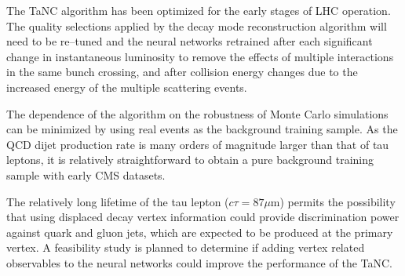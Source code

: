 The TaNC algorithm has been optimized for the early stages of LHC operation.
The quality selections applied by the decay mode reconstruction algorithm will
need to be re--tuned and the neural networks retrained after each significant
change in instantaneous luminosity to remove the effects of multiple
interactions in the same bunch crossing, and after collision energy changes due
to the increased energy of the multiple scattering events.  

The dependence of the algorithm on the robustness of Monte
Carlo simulations can be minimized by using real events as the background
training sample.  As the QCD dijet production rate is many orders of magnitude
larger than that of tau leptons, it is relatively straightforward to obtain a
pure background training sample with early CMS datasets.

The relatively long lifetime of the tau lepton ($c\tau = 87\mu$m) permits the
possibility that using displaced decay vertex information could provide
discrimination power against quark and gluon jets, which are expected to be
produced at the primary vertex.  A feasibility study is planned to determine if
adding vertex related observables to the neural networks could improve the
performance of the TaNC.
